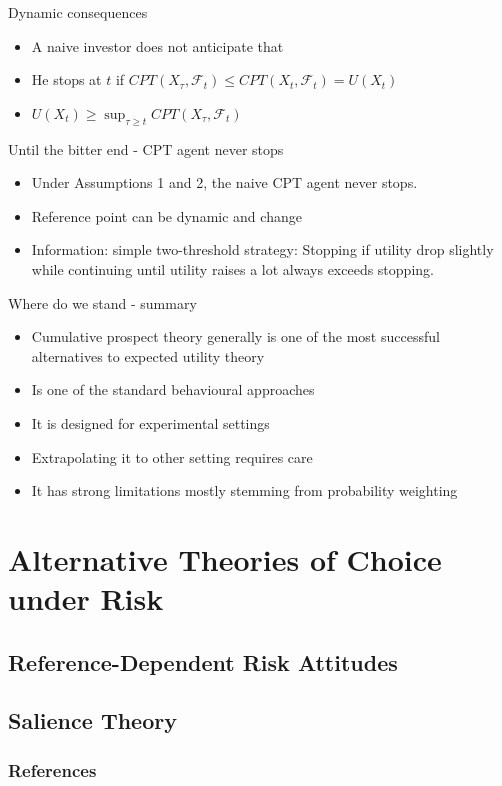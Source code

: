 \begin{frame}{Dynamic consequences}
    \begin{itemize}
        \item A naive investor does not anticipate that\medskip
        \item He stops at $t$ if $CPT(X_\tau,\mathcal{F}_t) \leq CPT(X_t,\mathcal{F}_t)=U(X_t)$\medskip
        \item $U(X_t) \geq \sup_{\tau \geq t} CPT(X_\tau,\mathcal{F}_t)$
    \end{itemize}
\end{frame}

\begin{frame}{Until the bitter end - CPT agent never stops}
    \begin{theorem}
        \begin{itemize}
        \item Under Assumptions 1 and 2, the naive CPT agent never stops.\medskip
        \item Reference point can be dynamic and change\medskip
        \item Information: simple two-threshold strategy:
        Stopping if utility drop slightly while continuing until utility raises a lot always exceeds stopping.\medskip
	\end{itemize}
\end{theorem}
\end{frame}

\begin{frame}{Where do we stand - summary}
    \begin{itemize}
        \item Cumulative prospect theory generally is one of the most successful alternatives to expected utility theory\medskip
        \item Is one of the standard behavioural approaches\medskip
        \item It is designed for experimental settings\medskip
        \item Extrapolating it to other setting requires care\medskip
        \item It has strong limitations mostly stemming from probability weighting\medskip
    \end{itemize}
\end{frame}




\section{Alternative Theories of Choice under Risk}
\subsection{Reference-Dependent Risk Attitudes}
\subsection{Salience Theory}

\begin{frame}[allowframebreaks]
    \frametitle{References}
    \renewcommand{\bibfont}{\normalfont\footnotesize}
    \printbibliography
\end{frame}


